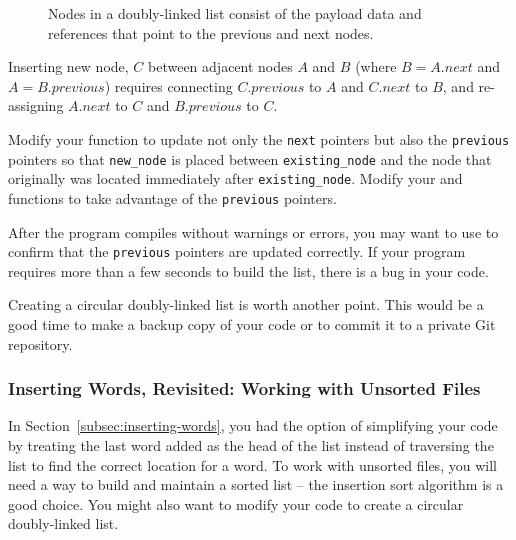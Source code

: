 \begin{figure}[h]
    \centering
    \caption{Nodes in a doubly-linked list consist of the payload data and references that point to the previous and next nodes.}\label{fig:doubly-linked-list}
\end{figure}

Inserting new node, $C$ between adjacent nodes $A$ and $B$ (where $B = A.next$ and $A = B.previous$) requires connecting $C.previous$ to $A$ and $C.next$ to $B$, and re-assigning $A.next$ to $C$ and $B.previous$ to $C$.

Modify your  function to update not only the \lstinline{next} pointers but also the \lstinline{previous} pointers so that \lstinline{new_node} is placed between \lstinline{existing_node} and the node that originally was located immediately after \lstinline{existing_node}.
Modify your  and  functions to take advantage of the \lstinline{previous} pointers.

After the program compiles without warnings or errors, you may want to use  to confirm that the \lstinline{previous} pointers are updated correctly.
If your program requires more than a few seconds to build the list, there is a bug in your code.

Creating a circular doubly-linked list is worth another point.
This would be a good time to make a backup copy of your code or to commit it to a private Git repository.

\subsubsection{Inserting Words, Revisited: Working with Unsorted Files} \label{subsubsec:insertionsort}

In Section~\ref{subsec:inserting-words}, you had the option of simplifying your code by treating the last word added as the head of the list instead of traversing the list to find the correct location for a word.
To work with unsorted files, you will need a way to build and maintain a sorted list -- the insertion sort algorithm is a good choice.
You might also want to modify your code to create a circular doubly-linked list.


